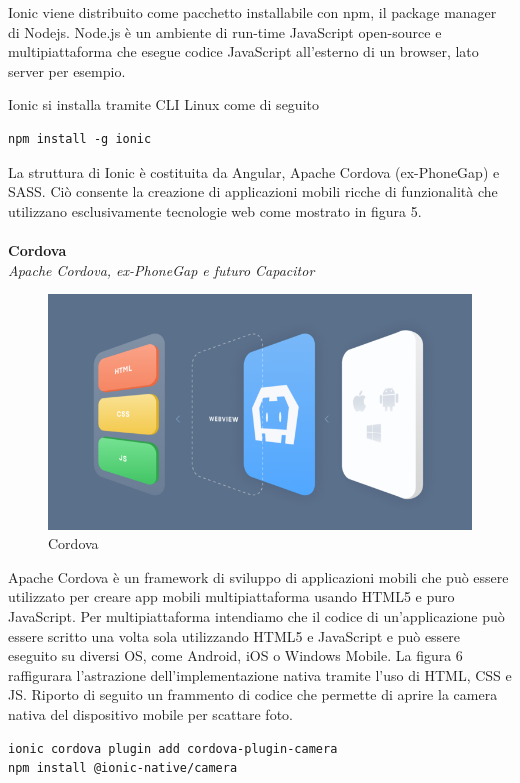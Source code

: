 Ionic viene distribuito come pacchetto installabile con npm, il package manager di Nodejs.
Node.js è un ambiente di run-time JavaScript open-source e multipiattaforma che esegue codice JavaScript all'esterno di un browser, lato server per esempio.

Ionic si installa tramite CLI Linux come di seguito
\begin{lstlisting}
npm install -g ionic
\end{lstlisting}

La struttura di Ionic è costituita da Angular, Apache Cordova (ex-PhoneGap) e SASS. Ciò consente la creazione di applicazioni mobili ricche di funzionalità che utilizzano esclusivamente tecnologie web come mostrato in figura 5.
\\\\
\textbf{Cordova}\\
\textit{Apache Cordova, ex-PhoneGap e futuro Capacitor}

\begin{figure}[h!]
    \centering  
    \caption{Cordova}
    \includegraphics[scale=0.80]{img/cap2/cordova}
\end{figure}

Apache Cordova è un framework di sviluppo di applicazioni mobili che può essere utilizzato per creare app mobili multipiattaforma usando HTML5 e puro JavaScript. 
Per multipiattaforma intendiamo che il codice di un'applicazione può essere scritto una volta sola utilizzando HTML5 e JavaScript e può essere eseguito su diversi OS, come Android, iOS o Windows Mobile.
La figura 6 raffigurara l'astrazione dell'implementazione nativa tramite l'uso di HTML, CSS e JS.
Riporto di seguito un frammento di codice che permette di aprire la camera nativa del dispositivo mobile per scattare foto.
\\
\begin{lstlisting}
ionic cordova plugin add cordova-plugin-camera
npm install @ionic-native/camera
\end{lstlisting}

